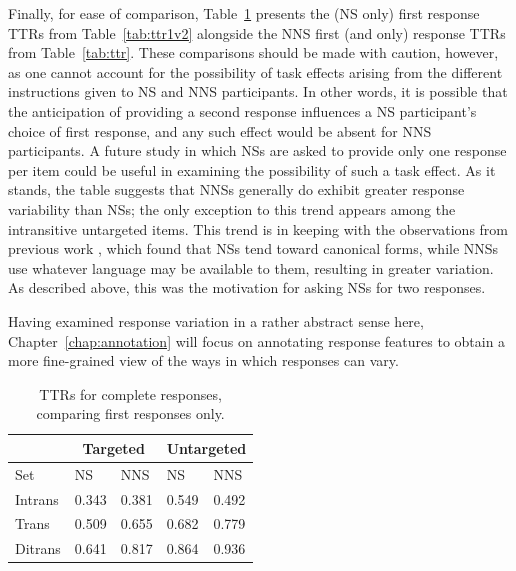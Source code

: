 Finally, for ease of comparison, Table~\ref{tab:ttr1v1} presents the (NS only) first response TTRs from Table~\ref{tab:ttr1v2} alongside the NNS first (and only) response TTRs from Table~\ref{tab:ttr}. These comparisons should be made with caution, however, as one cannot account for the possibility of task effects arising from the different instructions given to NS and NNS participants. In other words, it is possible that the anticipation of providing a second response influences a NS participant's choice of first response, and any such effect would be absent for NNS participants. A future study in which NSs are asked to provide only one response per item could be useful in examining the possibility of such a task effect. As it stands, the table suggests that NNSs generally do exhibit greater response variability than NSs; the only exception to this trend appears among the intransitive untargeted items. This trend is in keeping with the observations from previous work \citep{king:dickinson:13}, which found that NSs tend toward canonical forms, while NNSs use whatever language may be available to them, resulting in greater variation. As described above, this was the motivation for asking NSs for two responses.

Having examined response variation in a rather abstract sense here, Chapter~\ref{chap:annotation} will focus on annotating response features to obtain a more fine-grained view of the ways in which responses can vary.

\begin{table}[hb!]
\begin{center}
\begin{tabular}{|l||l|l||l|l|}
\hline
 & \multicolumn{2}{|c||}{Targeted} & \multicolumn{2}{|c|}{Untargeted} \\
\hline
 Set & NS & NNS & NS & NNS \\
\hline
\hline
Intrans & 0.343 & 0.381 & 0.549 & 0.492 \\
\hline
Trans & 0.509 & 0.655 & 0.682 & 0.779 \\ %
\hline
Ditrans & 0.641 & 0.817 & 0.864 & 0.936  \\ 
\hline
\end{tabular}
\caption{\label{tab:ttr1v1} TTRs for complete responses, comparing first responses only.}
\end{center}
\end{table}


